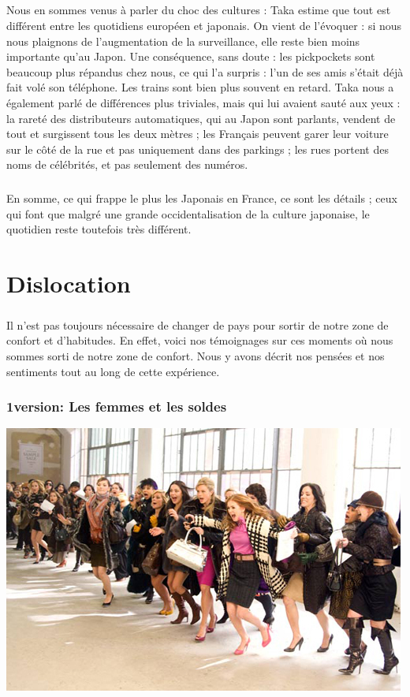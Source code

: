 \paragraph{}
Nous en sommes venus à parler du choc des cultures : Taka estime que tout est différent entre les quotidiens européen et japonais. On vient de l’évoquer : si nous nous plaignons de l’augmentation de la surveillance, elle reste bien moins importante qu’au Japon. Une conséquence, sans doute : les pickpockets sont beaucoup plus répandus chez nous, ce qui l’a surpris : l’un de ses amis s’était déjà fait volé son téléphone. Les trains sont bien plus souvent en retard. Taka nous a également parlé de différences plus triviales, mais qui lui avaient sauté aux yeux : la rareté des distributeurs automatiques, qui au Japon sont parlants, vendent de tout et surgissent tous les deux mètres ; les Français peuvent garer leur voiture sur le côté de la rue et pas uniquement dans des parkings ; les rues portent des noms de célébrités, et pas seulement des numéros.
\paragraph{}
En somme, ce qui frappe le plus les Japonais en France, ce sont les détails ; ceux qui font que malgré une grande occidentalisation de la culture japonaise, le quotidien reste toutefois très différent.



\chapter{Dislocation}
\paragraph{}
Il n'est pas toujours nécessaire de changer de pays pour sortir de notre zone de confort et d'habitudes. En effet, voici nos témoignages sur ces moments où nous sommes sorti de notre zone de confort. Nous y avons décrit nos pensées et nos sentiments tout au long de cette expérience.

\subsection{1\ier version: Les femmes et les soldes}
\begin{center}
\includegraphics[scale=0.7]{solde.jpg}
\end{center}
